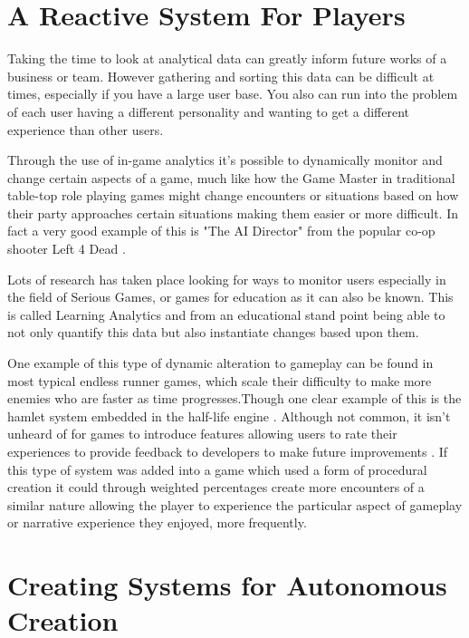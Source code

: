 \documentclass{scrartcl}
\begin{document}
\section{A Reactive System For Players}

Taking the time to look at analytical data can greatly inform future works of a business or team. However gathering and sorting this data can be difficult at times, especially if you have a large user base. You also can run into the problem of each user having a different personality and wanting to get a different experience than other users.

Through the use of in-game analytics it's possible to dynamically monitor and change certain aspects of a game, much like how the Game Master in traditional table-top role playing games might change encounters or situations based on how their party approaches certain situations making them easier or more difficult. \cite{sega1999house} In fact a very good example of this is "The AI Director" from the popular co-op shooter Left 4 Dead \cite{valve2008left}. 

Lots of research has taken place looking for ways to monitor users especially in the field of Serious Games, or games for education as it can also be known. \cite{shute2009melding} \cite{hauge2014implications} This is called Learning Analytics \cite{fournier2011value} and from an educational stand point being able to not only quantify this data but also instantiate changes based upon them.

One example of this type of dynamic alteration to gameplay can be found in most typical endless runner games, which scale their difficulty to make more enemies who are faster as time progresses.Though one clear example of this is the hamlet system embedded in the half-life engine \cite{hunicke2005case}.  Although not common, it isn't unheard of for games to introduce features allowing users to rate their experiences to provide feedback to developers to make future improvements \cite{ubisoft2013assassins}. If this type of system was added into a game which used a form of procedural creation it could through weighted percentages create more encounters of a similar nature allowing the player to experience the particular aspect of gameplay or narrative experience they enjoyed, more frequently.

\section{Creating Systems for Autonomous Creation}
\end{document}
